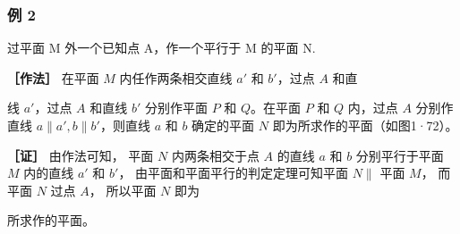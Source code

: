\subsubsection{例 2}

过平面 M 外一个已知点 A，作一个平行于 M 的平面 N.

\textbf{［作法］} 在平面 \(M\) 内任作两条相交直线 \(a'\) 和 \(b'\)，过点
\(A\) 和直

线 \(a'\)，过点 \(A\) 和直线 \(b'\) 分别作平面 \(P\) 和 \(Q\)。在平面
\(P\) 和 \(Q\) 内，过点 \(A\) 分别作直线
\(a \parallel a', b \parallel b'\)，则直线 \(a\) 和 \(b\) 确定的平面
\(N\) 即为所求作的平面（如图1·72）。

\textbf{［证］} 由作法可知， 平面 \(N\) 内两条相交于点 \(A\) 的直线
\(a\) 和 \(b\) 分别平行于平面 \(M\) 内的直线 \(a'\) 和 \(b'\)，
由平面和平面平行的判定定理可知平面 \(N \parallel\) 平面 \(M\)， 而平面
\(N\) 过点 \(A\)， 所以平面 \(N\) 即为

所求作的平面。


